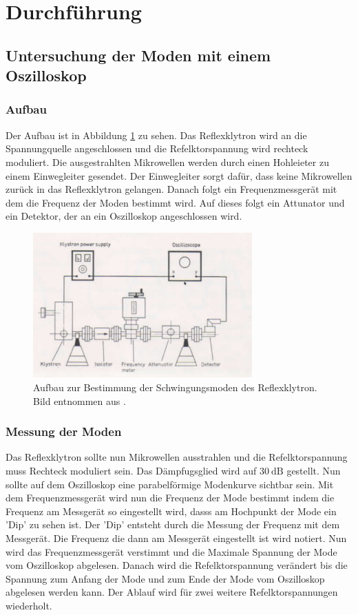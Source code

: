 \section{Durchführung}
\label{sec:Durchführung}

\subsection{Untersuchung der Moden mit einem Oszilloskop}
\subsubsection{Aufbau}
Der Aufbau ist in Abbildung \ref{fig:moden_aufbau} zu sehen.
Das Reflexklytron wird an die Spannungquelle angeschlossen und die Refelktorspannung wird rechteck moduliert.
Die ausgestrahlten Mikrowellen werden durch einen Hohleieter zu einem Einwegleiter gesendet.
Der Einwegleiter sorgt dafür, dass keine Mikrowellen zurück in das Reflexklytron gelangen.
Danach folgt ein Frequenzmessgerät mit dem die Frequenz der Moden bestimmt wird.
Auf dieses folgt ein Attunator und ein Detektor, der an ein Oszilloskop angeschlossen wird.

\begin{figure}
    \centering
    \includegraphics[width=0.75\textwidth]{content/data/Aufbau_Moden.png}
    \caption{Aufbau zur Bestimmung der Schwingungsmoden des Reflexklytron. Bild entnommen aus \cite[8]{Anleitung}.}
    \label{fig:moden_aufbau}
\end{figure}

\subsubsection{Messung der Moden}
\label{sec:moden_durchfuehrung}
Das Reflexklytron sollte nun Mikrowellen ausstrahlen und die Refelktorspannung muss Rechteck moduliert sein. Das Dämpfugsglied wird auf $\SI{30}{\dB}$ gestellt.
Nun sollte auf dem Oszilloskop eine parabelförmige Modenkurve sichtbar sein.
Mit dem Frequenzmessgerät wird nun die Frequenz der Mode bestimmt indem die Frequenz am Messgerät so eingestellt wird, dasss am Hochpunkt der Mode ein 'Dip' zu sehen ist.
Der 'Dip' entsteht durch die Messung der Frequenz mit dem Messgerät.
Die Frequenz die dann am Messgerät eingestellt ist wird notiert.
Nun wird das Frequenzmessgerät verstimmt und die Maximale Spannung der Mode vom Oszilloskop abgelesen.
Danach wird die Refelktorspannung verändert bis die Spannung zum Anfang der Mode und zum Ende der Mode vom Oszilloskop abgelesen werden kann.
Der Ablauf wird für zwei weitere Refelktorspannungen wiederholt.


